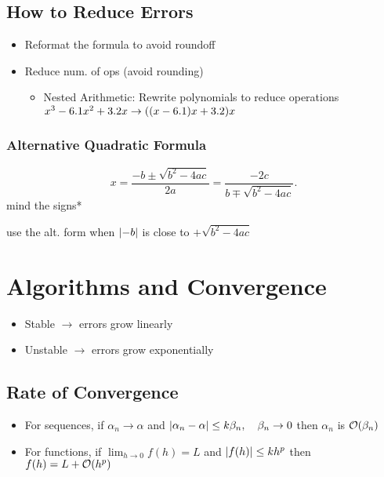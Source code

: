 \documentclass[8pt, letterpaper]{extarticle}
\begin{document}
\begin{multicols*}{3}
  \subsection{How to Reduce Errors}
  \begin{itemize}
    \item Reformat the formula to avoid roundoff
    \item Reduce num. of ops (avoid rounding)
      \begin{itemize}
        \item Nested Arithmetic: Rewrite polynomials to reduce operations
          \newline
          $x^3 - 6.1x^2 + 3.2x \to \pqty{\pqty{x-6.1}x + 3.2}x$
      \end{itemize}
  \end{itemize}

  \subsubsection{Alternative Quadratic Formula}
  \begin{equation*}
  x = \frac{-b \pm \sqrt{b^2 - 4ac}}{2a} = \frac{-2c}{b \mp \sqrt{b^2 - 4ac}}  
  .\end{equation*}
  \tiny *mind the signs*

  \normalsize
  use the alt. form when $\abs{-b}$ is close to $+ \sqrt{b^2 - 4ac}$

  \section{Algorithms and Convergence}
  \begin{itemize}
    \item Stable $\to$ errors grow linearly
    \item Unstable $\to$ errors grow exponentially
  \end{itemize}

  \subsection{Rate of Convergence}
  \begin{itemize}
    \item For sequences, if $\alpha_n \to \alpha$ and $\abs{\alpha_n - \alpha}
      \leq k \beta_n, \quad \beta_n \to 0$ then $\alpha_n$ is $\order{\beta_n}$
    \item For functions, if $\lim_{h \to 0} f(h) = L$ and $\abs{f(h)} \leq kh^p$
      then $f(h) = L + \order{h^p}$
  \end{itemize}


\end{multicols*}
\end{document}
